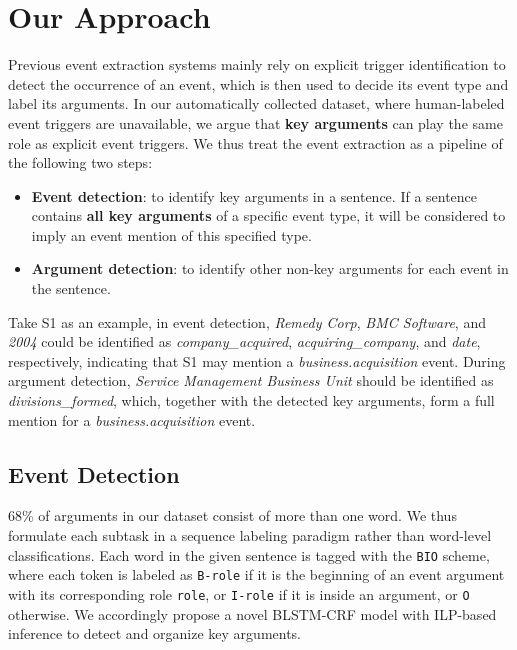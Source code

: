 \section{Our Approach}
Previous event extraction systems mainly rely on explicit trigger identification to detect the occurrence of an event, 
which is then used to decide its event type and label its arguments.
In our automatically collected dataset, where human-labeled event triggers are unavailable, we argue that \textbf{key arguments} can play the same role as explicit event triggers. 
We thus treat the event extraction as a pipeline of the following two steps: 
\begin{itemize}
	\item \textbf{Event detection}: to identify key arguments in a sentence. If a sentence contains \textbf{all key arguments} of a specific event type, it will be considered to imply an event mention of this specified type. 
	\item \textbf{Argument detection}: to identify other non-key arguments for each event in the sentence.
\end{itemize}
%
Take S1 as an example, in event detection, \emph{Remedy Corp}, \emph{BMC Software}, and \emph{2004} could be identified as \emph{company\_acquired}, \emph{acquiring\_company}, and \emph{date}, respectively, indicating that S1 may mention a \emph{business.acquisition} event. 
During argument detection, \emph{Service Management Business Unit} should be identified as \emph{divisions\_formed}, 
which, together with the detected key arguments, form a full mention for a \emph{business.acquisition} event.  

\subsection{Event Detection \label{evede}}

68\%  of  arguments in our dataset consist of more than one word. We thus formulate each subtask in a sequence labeling paradigm rather than word-level classifications. Each word in the given sentence is tagged with the \texttt{BIO} scheme, where each token is labeled as \texttt{B-role} if it is the beginning of an event argument with its corresponding role \texttt{role}, or \texttt{I-role} if it is inside an argument, or \texttt{O} otherwise.  We accordingly propose a novel BLSTM-CRF model with ILP-based inference to detect and organize key arguments.

